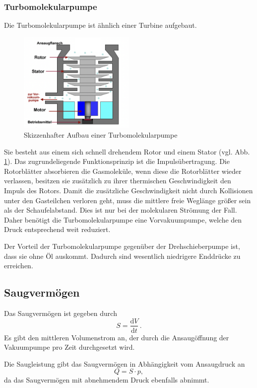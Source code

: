 \subsubsection{Turbomolekularpumpe}
Die Turbomolekularpumpe ist ähnlich einer Turbine aufgebaut.
\begin{figure}[h]
    \centering
    \includegraphics[width=0.5\textwidth]{abb/Turbopumpe.png}
    \caption{Skizzenhafter Aufbau einer Turbomolekularpumpe \cite{turbo}}
    \label{fig:turbo0}
\end{figure}
Sie besteht aus einem sich schnell drehendem Rotor und einem Stator (vgl. Abb. \ref{fig:turbo0}).
Das zugrundeliegende Funktionsprinzip ist die Impulsübertragung.
Die Rotorblätter absorbieren die Gasmoleküle, 
wenn diese die Rotorblätter wieder verlassen, besitzen sie zusätzlich zu ihrer thermischen Geschwindigkeit den Impuls des Rotors.
Damit die zusätzliche Geschwindigkeit nicht durch Kollisionen unter den Gasteilchen verloren geht,
muss die mittlere freie Weglänge größer sein als der Schaufelabstand.
Dies ist nur bei der molekularen Strömung der Fall.
Daher benötigt die Turbomolekularpumpe eine Vorvakuumpumpe,
welche den Druck entsprechend weit reduziert.

Der Vorteil der Turbomolekularpumpe gegenüber der Drehschieberpumpe ist,
dass sie ohne Öl auskommt.
Dadurch sind wesentlich niedrigere Enddrücke zu erreichen.


\subsection{Saugvermögen}
Das Saugvermögen ist gegeben durch 
\begin{equation}
    S =\frac{\text{d}V}{\text{d}t}\, .
\end{equation}
Es gibt den mittleren Volumenstrom an,
der durch die Ansaugöffnung der Vakuumpumpe pro Zeit durchgesetzt wird.

Die Saugleistung gibt das Saugvermögen in Abhängigkeit vom Ansaugdruck an
\begin{equation}
    Q = S\cdot p,
    \label{eq:leckQ}
\end{equation}
da das Saugvermögen mit abnehmendem Druck ebenfalls abnimmt.

